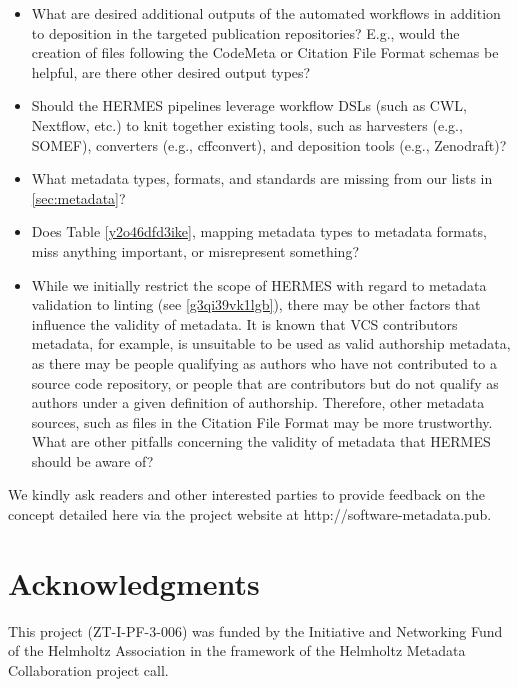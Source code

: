 \documentclass{article}
\begin{document}
\begin{itemize}  
\item What are desired additional outputs of the automated workflows in addition to deposition in the targeted publication repositories? E.g., would the creation of files following the CodeMeta or Citation File Format schemas be helpful, are there other desired output types?


\item Should the HERMES pipelines leverage workflow DSLs (such as CWL, Nextflow, etc.) to knit together existing tools, such as harvesters (e.g., SOMEF), converters (e.g., cffconvert), and deposition tools (e.g., Zenodraft)?


\item What metadata types, formats, and standards are missing from our lists in \ref{sec:metadata}?


\item Does Table \ref{y2o46dfd3ike}, mapping metadata types to metadata formats, miss anything important, or misrepresent something?


\item While we initially restrict the scope of HERMES with regard to metadata validation to linting (see \ref{g3qi39vk1lgb}), there may be other factors that influence the validity of metadata. It is known that VCS contributors metadata, for example, is unsuitable to be used as valid authorship metadata, as there may be people qualifying as authors who have not contributed to a source code repository, or people that are contributors but do not qualify as authors under a given definition of authorship. Therefore, other metadata sources, such as files in the Citation File Format may be more trustworthy. What are other pitfalls concerning the validity of metadata that HERMES should be aware of?


\end{itemize}We kindly ask readers and other interested parties to provide feedback on the concept detailed here via the project website at http://software-metadata.pub.



\section{Acknowledgments}\label{giyko1j}
This project (ZT-I-PF-3-006) was funded by the Initiative and Networking Fund of the Helmholtz Association in the framework of the Helmholtz Metadata Collaboration project call.
\end{document}
